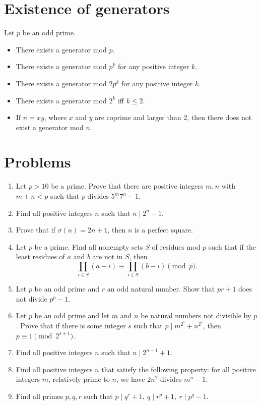 \documentclass{article}
\begin{document}
\section{Existence of generators}
Let $p$ be an odd prime.
\begin{itemize}
  \item There exists a generator mod $p$.
  \item There exists a generator mod $p^k$ for any positive integer $k$.
  \item There exists a generator mod $2p^k$ for any positive integer $k$.
  \item There exists a generator mod $2^k$ iff $k\le 2$.
  \item If $n=xy$, where $x$ and $y$ are coprime and larger than $2$, then there
    does not exist a generator mod $n$.
\end{itemize}
\section{Problems}
\begin{enumerate}
  \item Let $p>10$ be a prime. Prove that there are positive integers $m,n$ with
    $m+n<p$ such that $p$ divides $5^m7^n-1$.
  \item Find all positive integers $n$ such that $n\mid 2^n-1$.
  \item Prove that if $\sigma(n)=2n+1$, then $n$ is a perfect square.
  \item Let $p$ be a prime. Find all nonempty sets $S$ of residues mod $p$ such
    that if the least residues of $a$ and $b$ are not in $S$, then \[\prod_{i\in S}(a-i)\equiv\prod_{i\in S}(b-i)\pmod
    p.\]
  \item Let $p$ be an odd prime and $r$ an odd natural number. Show that $pr+1$
    does not divide $p^p-1$.
  \item Let $p$ be an odd prime and let $m$ and $n$ be natural numbers not
    divisible by $p$. Prove that if there is some integer $s$ such that $p\mid
    m^{2^s}+n^{2^s}$, then $p\equiv 1\pmod{2^{s+1}}$.
  \item Find all positive integers $n$ such that $n\mid 2^{n-1}+1$.
  \item Find all positive integers $n$ that satisfy the following property:
    for all positive integers $m$, relatively prime to $n$, we have
    $2n^2$ divides $m^n-1$.
  \item Find all primes $p,q,r$ such that $p\mid q^r+1,\ q\mid r^p+1,\ r\mid
    p^q-1$.
\end{enumerate}
\newpage
\end{document}
